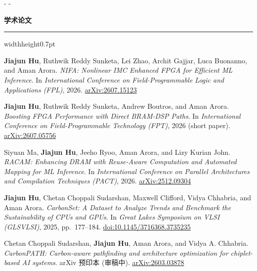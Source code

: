 \documentclass[10pt,letterpaper]{article}
\makeatletter
\newcommand{\detailsize}{\fontsize{9.5}{12}\selectfont}   %
\newcommand{\cvsection}[1]{%
  \needspace{6\baselineskip}\vspace{9pt}\nopagebreak
  {\fontsize{12.5}{15}\selectfont\bfseries\color{navy}#1\par}\vspace{2pt}\nopagebreak
  {\color{navy}\hrule width\linewidth height0.7pt}\nopagebreak
  \vspace{4pt}\nopagebreak}
\newcommand{\needspace}[1]{\par\penalty-100\begingroup
  \setlength{\dimen@}{#1}\dimen@ii\pagegoal\advance\dimen@ii-\pagetotal
  \ifdim\dimen@>\dimen@ii\ifdim\dimen@ii>\z@\vfil\fi\penalty-\@M\fi\endgroup}
\newenvironment{cvlist}{%
  \detailsize
  \begin{list}{\textbullet}{%
    \setlength{\itemsep}{4.5pt}\setlength{\parsep}{0pt}%
    \setlength{\topsep}{3pt}\setlength{\partopsep}{0pt}%
    \setlength{\leftmargin}{1.2em}\setlength{\labelwidth}{0.7em}%
    \setlength{\labelsep}{0.5em}}}%
  {\end{list}}
\makeatother
\begin{document}
\cvsection{学术论文}

\begin{cvlist}  %
  \item \textbf{Jiajun Hu}, Ruthwik Reddy Sunketa, Lei Zhao, Archit Gajjar, Luca Buonanno, and Aman Arora. \emph{NIFA: Nonlinear IMC Enhanced FPGA for Efficient ML Inference}. In \emph{International Conference on Field-Programmable Logic and Applications (FPL)}, 2026. \href{https://arxiv.org/abs/2607.15123}{arXiv:2607.15123}
  \item \textbf{Jiajun Hu}, Ruthwik Reddy Sunketa, Andrew Boutros, and Aman Arora. \emph{Boosting FPGA Performance with Direct BRAM-DSP Paths}. In \emph{International Conference on Field-Programmable Technology (FPT)}, 2026 (short paper). \href{https://arxiv.org/abs/2607.05756}{arXiv:2607.05756}
  \item Siyuan Ma, \textbf{Jiajun Hu}, Jeeho Ryoo, Aman Arora, and Lizy Kurian John. \emph{RACAM: Enhancing DRAM with Reuse-Aware Computation and Automated Mapping for ML Inference}. In \emph{International Conference on Parallel Architectures and Compilation Techniques (PACT)}, 2026. \href{https://arxiv.org/abs/2512.09304}{arXiv:2512.09304}
  \item \textbf{Jiajun Hu}, Chetan Choppali Sudarshan, Maxwell Clifford, Vidya Chhabria, and Aman Arora. \emph{CarbonSet: A Dataset to Analyze Trends and Benchmark the Sustainability of CPUs and GPUs}. In \emph{Great Lakes Symposium on VLSI (GLSVLSI)}, 2025, pp.~177--184. \href{https://doi.org/10.1145/3716368.3735235}{doi:10.1145/3716368.3735235}
  \item Chetan Choppali Sudarshan, \textbf{Jiajun Hu}, Aman Arora, and Vidya A. Chhabria. \emph{CarbonPATH: Carbon-aware pathfinding and architecture optimization for chiplet-based AI systems}. arXiv 预印本 (审稿中). \href{https://arxiv.org/abs/2603.03878}{arXiv:2603.03878}
\end{cvlist}
\end{document}
